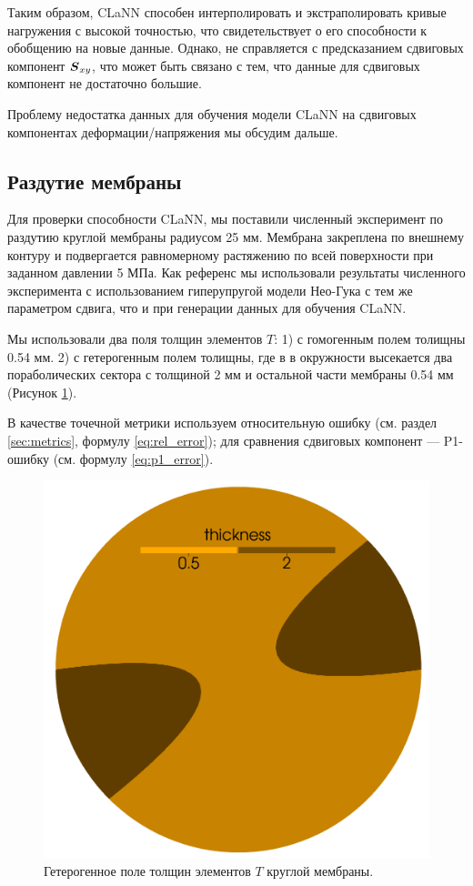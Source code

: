   Таким образом, CLaNN способен интерполировать и экстраполировать кривые нагружения с высокой точностью, что свидетельствует о его способности к обобщению на новые данные.
  Однако, не справляется с предсказанием сдвиговых компонент $\boldsymbol{S}_{xy}$, что может быть связано с тем, что данные для сдвиговых компонент не достаточно большие.
  
  Проблему недостатка данных для обучения модели CLaNN на сдвиговых компонентах деформации/напряжения мы обсудим дальше.
\subsection{Раздутие мембраны}

  Для проверки способности CLaNN, мы поставили численный эксперимент по раздутию круглой мембраны радиусом 25 мм.
  Мембрана закреплена по внешнему контуру и подвергается равномерному растяжению по всей поверхности при заданном давлении
  5 МПа. 
  Как референс мы использовали результаты численного эксперимента с использованием гиперупругой модели Нео-Гука с тем же параметром сдвига, 
  что и при генерации данных для обучения CLaNN.
  
  Мы использовали два поля толщин элементов $T$: 1) с гомогенным полем толищны 0.54 мм. 
  2) с гетерогенным полем толищны, где в в окружности высекается два пораболических сектора с толщиной 2 мм
  и остальной части мембраны 0.54 мм (Рисунок \ref{fig:membrane_thickness}). 

  В качестве точечной метрики используем относительную ошибку (см. раздел \ref{sec:metrics}, формулу \eqref{eq:rel_error});
  для сравнения сдвиговых компонент — P1-ошибку \cite{xie2024p1} (см. формулу \eqref{eq:p1_error}).

  \begin{figure}[H]
    \centering
    \includegraphics[width=0.25\linewidth]{img/het_circle.png}
    \caption{Гетерогенное поле толщин элементов $T$ круглой мембраны.}
    \label{fig:membrane_thickness}
  \end{figure}

